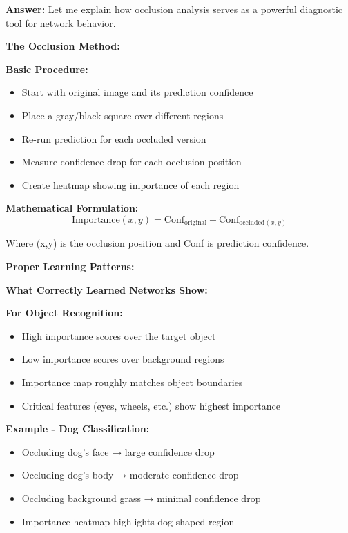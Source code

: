 \documentclass[12pt]{article}
\newcommand{\answer}[1]{{\color{answercolor}\textbf{Answer:} #1}}
\newcommand{\explanation}[1]{{\color{explanationcolor}#1}}
\begin{document}
\begin{enumerate}[(a)]
    \answer{
    Let me explain how occlusion analysis serves as a powerful diagnostic tool for network behavior.
    
    \textbf{The Occlusion Method:}
    
    \explanation{
    \textbf{Basic Procedure:}
    \begin{itemize}
        \item Start with original image and its prediction confidence
        \item Place a gray/black square over different regions
        \item Re-run prediction for each occluded version
        \item Measure confidence drop for each occlusion position
        \item Create heatmap showing importance of each region
    \end{itemize}
    
    \textbf{Mathematical Formulation:}
    \[
    \text{Importance}(x,y) = \text{Conf}_{\text{original}} - \text{Conf}_{\text{occluded}(x,y)}
    \]
    
    Where (x,y) is the occlusion position and Conf is prediction confidence.
    }
    
    \textbf{Proper Learning Patterns:}
    
    \explanation{
    \textbf{What Correctly Learned Networks Show:}
    
    \textbf{For Object Recognition:}
    \begin{itemize}
        \item High importance scores over the target object
        \item Low importance scores over background regions
        \item Importance map roughly matches object boundaries
        \item Critical features (eyes, wheels, etc.) show highest importance
    \end{itemize}
    
    \textbf{Example - Dog Classification:}
    \begin{itemize}
        \item Occluding dog's face → large confidence drop
        \item Occluding dog's body → moderate confidence drop
        \item Occluding background grass → minimal confidence drop
        \item Importance heatmap highlights dog-shaped region
    \end{itemize}
    
}}
\end{enumerate}
\end{document}
